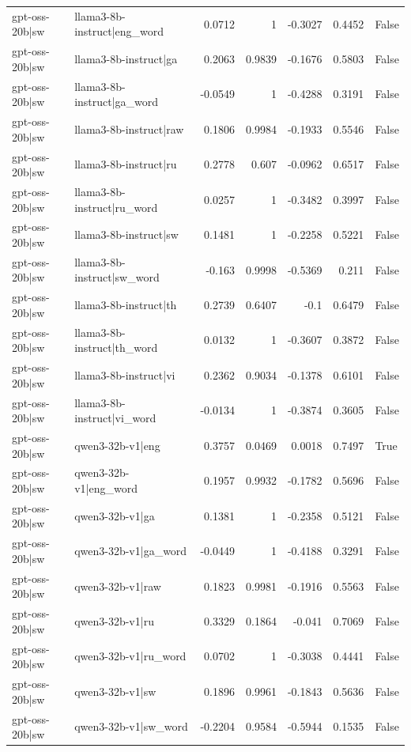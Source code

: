 \begin{table}
\begin{tabular}{l l r r r r l}
gpt-oss-20b|sw & llama3-8b-instruct|eng_word & 0.0712 & 1 & -0.3027 & 0.4452 & False \\
gpt-oss-20b|sw & llama3-8b-instruct|ga & 0.2063 & 0.9839 & -0.1676 & 0.5803 & False \\
gpt-oss-20b|sw & llama3-8b-instruct|ga_word & -0.0549 & 1 & -0.4288 & 0.3191 & False \\
gpt-oss-20b|sw & llama3-8b-instruct|raw & 0.1806 & 0.9984 & -0.1933 & 0.5546 & False \\
gpt-oss-20b|sw & llama3-8b-instruct|ru & 0.2778 & 0.607 & -0.0962 & 0.6517 & False \\
gpt-oss-20b|sw & llama3-8b-instruct|ru_word & 0.0257 & 1 & -0.3482 & 0.3997 & False \\
gpt-oss-20b|sw & llama3-8b-instruct|sw & 0.1481 & 1 & -0.2258 & 0.5221 & False \\
gpt-oss-20b|sw & llama3-8b-instruct|sw_word & -0.163 & 0.9998 & -0.5369 & 0.211 & False \\
gpt-oss-20b|sw & llama3-8b-instruct|th & 0.2739 & 0.6407 & -0.1 & 0.6479 & False \\
gpt-oss-20b|sw & llama3-8b-instruct|th_word & 0.0132 & 1 & -0.3607 & 0.3872 & False \\
gpt-oss-20b|sw & llama3-8b-instruct|vi & 0.2362 & 0.9034 & -0.1378 & 0.6101 & False \\
gpt-oss-20b|sw & llama3-8b-instruct|vi_word & -0.0134 & 1 & -0.3874 & 0.3605 & False \\
gpt-oss-20b|sw & qwen3-32b-v1|eng & 0.3757 & 0.0469 & 0.0018 & 0.7497 & True \\
gpt-oss-20b|sw & qwen3-32b-v1|eng_word & 0.1957 & 0.9932 & -0.1782 & 0.5696 & False \\
gpt-oss-20b|sw & qwen3-32b-v1|ga & 0.1381 & 1 & -0.2358 & 0.5121 & False \\
gpt-oss-20b|sw & qwen3-32b-v1|ga_word & -0.0449 & 1 & -0.4188 & 0.3291 & False \\
gpt-oss-20b|sw & qwen3-32b-v1|raw & 0.1823 & 0.9981 & -0.1916 & 0.5563 & False \\
gpt-oss-20b|sw & qwen3-32b-v1|ru & 0.3329 & 0.1864 & -0.041 & 0.7069 & False \\
gpt-oss-20b|sw & qwen3-32b-v1|ru_word & 0.0702 & 1 & -0.3038 & 0.4441 & False \\
gpt-oss-20b|sw & qwen3-32b-v1|sw & 0.1896 & 0.9961 & -0.1843 & 0.5636 & False \\
gpt-oss-20b|sw & qwen3-32b-v1|sw_word & -0.2204 & 0.9584 & -0.5944 & 0.1535 & False \\

\end{tabular}
\end{table}
